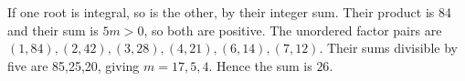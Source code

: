 If one root is integral, so is the other, by their integer sum. Their product is 84 and their sum is $5m>0$, so both are positive. The unordered factor pairs are $(1,84),(2,42),(3,28),(4,21),(6,14),(7,12)$. Their sums divisible by five are 85,25,20, giving $m=17,5,4$. Hence the sum is $\boxed{26}$.
